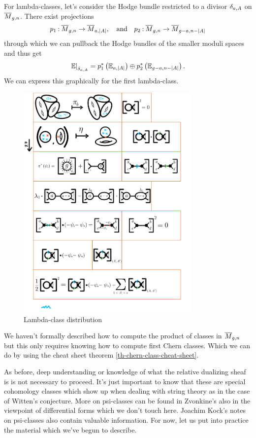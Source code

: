 \documentclass[12pt]{memoir}
\begin{document}
\begin{Ex}%
    For lambda-classes, let's consider the Hodge bundle restricted to a divisor $\delta_{a,A}$ on $\overline M_{g,n}$. There exist projections 
    $$p_1\mathbin{:}\overline{M}_{g,n}\to\overline{M}_{a,|A|},\quad\text{and}\quad p_2\mathbin{:}\overline{M}_{g,n}\to\overline{M}_{g-a,n-|A|}$$
    through which we can pullback the Hodge bundles of the smaller moduli spaces and thus get 
    $$\left.\mathbb{E}\right|_{\delta_{a,A}}=p_1^\ast\left(\mathbb{E}_{a,|A|}\right)\oplus p_2^\ast\left(\mathbb{E}_{g-a,n-|A|}\right).$$
    We can express this graphically for the first lambda-class.
     \begin{figure}[h!]
        \centering
        \includegraphics[width=0.8\textwidth, trim= 1.3cm 13.5cm 5.1cm 11.8cm,clip]{../figs/FigsDNnotability2.pdf}
        \caption{Lambda-class distribution}
        \label{fig:lambda-class-distribution}
    \end{figure}

    We haven't formally described how to compute the product of classes in $\overline M_{g,n}$ but this only requires knowing how to compute first Chern classes. Which we can do by using the cheat sheet theorem \ref{th-chern-class-cheat-sheet}.
\end{Ex}
As before, deep understanding or knowledge of what the relative dualizing sheaf is is not necessary to proceed. It's just important to know that these are special cohomology classes which show up when dealing with string theory as in the case of Witten's conjecture. More on psi-classes can be found in Zvonkine's \cite{ZvonkineIntro} also in the viewpoint of differential forms which we don't touch here. Joachim Kock's notes on psi-classes \cite{KockPsiClasses} also contain valuable information. For now, let us put into practice the material which we've begun to describe. 
\end{document}
